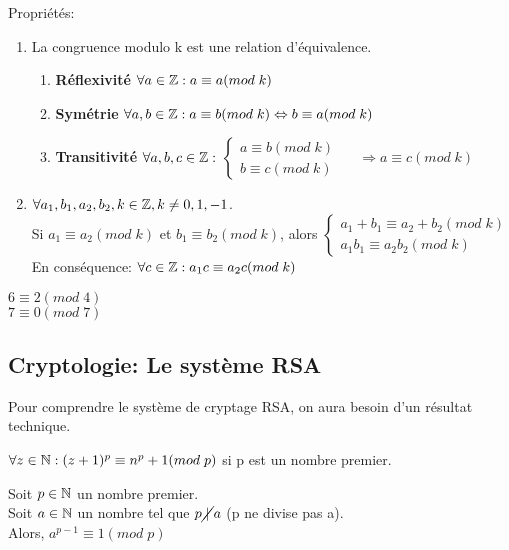 Propriétés:

\begin{enumerate}
\item La congruence modulo k est une relation d'équivalence.
	\begin{enumerate}[-]
	\item \textbf{Réflexivité} $\forall a \in \mathbb{Z}: a \equiv a(mod\;k)$
	\item \textbf{Symétrie} $\forall a,b \in \mathbb{Z}: a \equiv b(mod\;k) \Leftrightarrow b \equiv a(mod\;k)$
	\item \textbf{Transitivité} $\forall a,b,c \in \mathbb{Z}:$
				$ \left\{\begin{matrix}
				a \equiv b(mod\;k)\\ 
				b \equiv c(mod\;k)
				\end{matrix}\right.$ $\quad \Rightarrow a\equiv c(mod\;k)$
	\end{enumerate}

\item $\forall a_1,b_1,a_2,b_2,k \in \mathbb{Z}, k\neq 0,1,-1$. \\
Si $a_1 \equiv a_2 (mod\;k)$ et $b_1 \equiv b_2 (mod\;k)$, alors $\left\{\begin{matrix}
					a_1 + b_1 \equiv a_2 + b_2 (mod\;k)\\ 
					a_1 b_1 \equiv a_2 b_2 (mod\;k)
					\end{matrix}\right.$\\
En conséquence: $\forall c\in \mathbb{Z}: a_1 c \equiv a_2 c(mod\;k)$
\end{enumerate}

\begin{exmp}
$6 \equiv 2(mod\;4)$\\
$7 \equiv 0(mod\;7)$
\end{exmp}

\newpage

\subsection{Cryptologie: Le système RSA}

Pour comprendre le système de cryptage RSA, on aura besoin d'un résultat technique.

\begin{lemme}
$\forall z \in \mathbb{N}: (z+1)^p \equiv n^p + 1(mod\;p)$ si p est un nombre premier.
\end{lemme}

\begin{thrm}
Soit $p\in \mathbb{N}$ un nombre premier.\\
Soit $a\in \mathbb{N}$ un nombre tel que $p\cancel{\;|\;}a$ (p ne divise pas a).\\
Alors, $a^{p-1} \equiv 1(mod\;p)$\\
\end{thrm}

